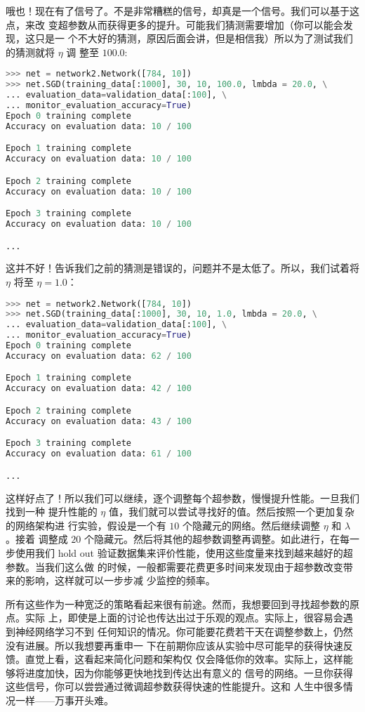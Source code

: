 哦也！现在有了信号了。不是非常糟糕的信号，却真是一个信号。我们可以基于这点，来改
变超参数从而获得更多的提升。可能我们猜测\learningrate{}需要增加（你可以能会发现，这只是一
  个不大好的猜测，原因后面会讲，但是相信我）所以为了测试我们的猜测就将 $\eta$ 调
整至 $100.0$:
\begin{lstlisting}[language=Python]
>>> net = network2.Network([784, 10])
>>> net.SGD(training_data[:1000], 30, 10, 100.0, lmbda = 20.0, \
... evaluation_data=validation_data[:100], \
... monitor_evaluation_accuracy=True)
Epoch 0 training complete
Accuracy on evaluation data: 10 / 100

Epoch 1 training complete
Accuracy on evaluation data: 10 / 100

Epoch 2 training complete
Accuracy on evaluation data: 10 / 100

Epoch 3 training complete
Accuracy on evaluation data: 10 / 100

...
\end{lstlisting}

这并不好！告诉我们之前的猜测是错误的，问题并不是\learningrate{}太低了。所以，我们试着将
$\eta$ 将至 $\eta=1.0$：
\begin{lstlisting}[language=Python]
>>> net = network2.Network([784, 10])
>>> net.SGD(training_data[:1000], 30, 10, 1.0, lmbda = 20.0, \
... evaluation_data=validation_data[:100], \
... monitor_evaluation_accuracy=True)
Epoch 0 training complete
Accuracy on evaluation data: 62 / 100

Epoch 1 training complete
Accuracy on evaluation data: 42 / 100

Epoch 2 training complete
Accuracy on evaluation data: 43 / 100

Epoch 3 training complete
Accuracy on evaluation data: 61 / 100

...
\end{lstlisting}

这样好点了！所以我们可以继续，逐个调整每个超参数，慢慢提升性能。一旦我们找到一种
提升性能的 $\eta$ 值，我们就可以尝试寻找好的值。然后按照一个更加复杂的网络架构进
行实验，假设是一个有 $10$ 个隐藏元的网络。然后继续调整 $\eta$ 和 $\lambda$。接着
调整成 $20$ 个隐藏元。然后将其他的超参数调整再调整。如此进行，在每一步使用我们
hold out 验证数据集来评价性能，使用这些度量来找到越来越好的超参数。当我们这么做
的时候，一般都需要花费更多时间来发现由于超参数改变带来的影响，这样就可以一步步减
少监控的频率。

所有这些作为一种宽泛的策略看起来很有前途。然而，我想要回到寻找超参数的原点。实际
上，即使是上面的讨论也传达出过于乐观的观点。实际上，很容易会遇到神经网络学习不到
任何知识的情况。你可能要花费若干天在调整参数上，仍然没有进展。所以我想要再重申一
下在前期你应该从实验中尽可能早的获得快速反馈。直觉上看，这看起来简化问题和架构仅
仅会降低你的效率。实际上，这样能够将进度加快，因为你能够更快地找到传达出有意义的
信号的网络。一旦你获得这些信号，你可以尝尝通过微调超参数获得快速的性能提升。这和
人生中很多情况一样——万事开头难。

